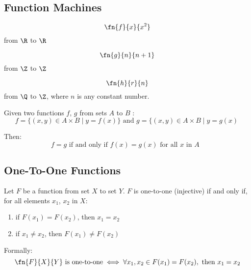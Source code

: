 \documentclass[11pt]{article}
\begin{document}
\subsection{Function Machines}

\begin{definition}\label{def:sqr-fn}
    \begin{equation*}
        \fn{f}{x}{x^2}
    \end{equation*}
    from $\R$ to $\R$
\end{definition}

\begin{definition}\label{def:succ-fn}
    \begin{equation*}
        \fn{g}{n}{n + 1}
    \end{equation*}
    from $\Z$ to $\Z$
\end{definition}

\begin{definition}\label{def:const-fn}
    \begin{equation*}
        \fn{h}{r}{n}
    \end{equation*}
    from $\Q$ to $\Z$, where $n$ is any constant number.
\end{definition}

\begin{definition}\label{def:function-equality}
    Given two functions $f$, $g$ from sets $A$ to $B$ :
    \begin{equation*}
        f = \{ (x,y) \in A \times B \mid y = f(x) \} \text{ and } g = \{ (x,y) \in A \times B \mid y = g(x) \
    \end{equation*}
    
    Then:
    \begin{equation*}
        f = g \text{ if and only if } f(x) = g(x) \text{ for all $x$ in $A$ }
    \end{equation*}
\end{definition}

\subsection{One-To-One Functions}
\begin{definition}\label{def:one-to-one}
    Let $F$ be a function from set $X$ to set $Y$. $F$ is one-to-one (injective) if
    and only if, for all elements $x_1$, $x_2$ in $X$:
    \begin{enumerate}
        \item if $F(x_1) = F(x_2)$, then $x_1 = x_2$
        \item if $x_1 \neq x_2$, then $F(x_1) \neq F(x_2)$
    \end{enumerate}

    Formally:
    \begin{equation*}
        \fn{F}{X}{Y} \text{ is one-to-one} \iff \forall x_1,x_2 \in F(x_1) = F(x_2), \text{ then } x_1 = x_2
    \end{equation*}
\end{definition}
\end{document}
